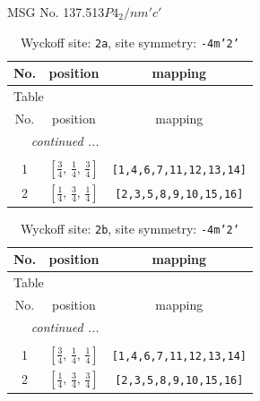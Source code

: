 \documentclass[fleqn,8pt]{jsarticle}
\begin{document}
\setcounter{MaxMatrixCols}{32}

\renewcommand{\tablename}{Table~}
\renewcommand{\figurename}{Figure~}
\begin{center}
\LARGE
MSG No. 137.513\quad$P4_{2}/nm'c'$
\end{center}
\renewcommand{\arraystretch}{1.2}
\begin{longtable}{ccc}
\caption{Wyckoff site: {\tt 2a}, site symmetry: {\tt -4m'2'}}
 \\
 \hline \hline
No. & position & mapping \\ \hline \endfirsthead

\multicolumn{2}{l}{\tablename\ \thetable{}} \\
 \hline \hline
No. & position & mapping \\ \hline \endhead

 \hline \hline
\multicolumn{2}{r}{\footnotesize\it continued ...} \\ \endfoot

 \hline \hline
\multicolumn{2}{r}{} \\ \endlastfoot

1 & $\left[ \frac{3}{4},\, \frac{1}{4},\, \frac{3}{4} \right]$ & {\tt [1,4,6,7,11,12,13,14]} \\ \hline
2 & $\left[ \frac{1}{4},\, \frac{3}{4},\, \frac{1}{4} \right]$ & {\tt [2,3,5,8,9,10,15,16]} \\
\end{longtable}
\renewcommand{\arraystretch}{1.2}
\begin{longtable}{ccc}
\caption{Wyckoff site: {\tt 2b}, site symmetry: {\tt -4m'2'}}
 \\
 \hline \hline
No. & position & mapping \\ \hline \endfirsthead

\multicolumn{2}{l}{\tablename\ \thetable{}} \\
 \hline \hline
No. & position & mapping \\ \hline \endhead

 \hline \hline
\multicolumn{2}{r}{\footnotesize\it continued ...} \\ \endfoot

 \hline \hline
\multicolumn{2}{r}{} \\ \endlastfoot

1 & $\left[ \frac{3}{4},\, \frac{1}{4},\, \frac{1}{4} \right]$ & {\tt [1,4,6,7,11,12,13,14]} \\ \hline
2 & $\left[ \frac{1}{4},\, \frac{3}{4},\, \frac{3}{4} \right]$ & {\tt [2,3,5,8,9,10,15,16]} \\
\end{longtable}
\end{document}
